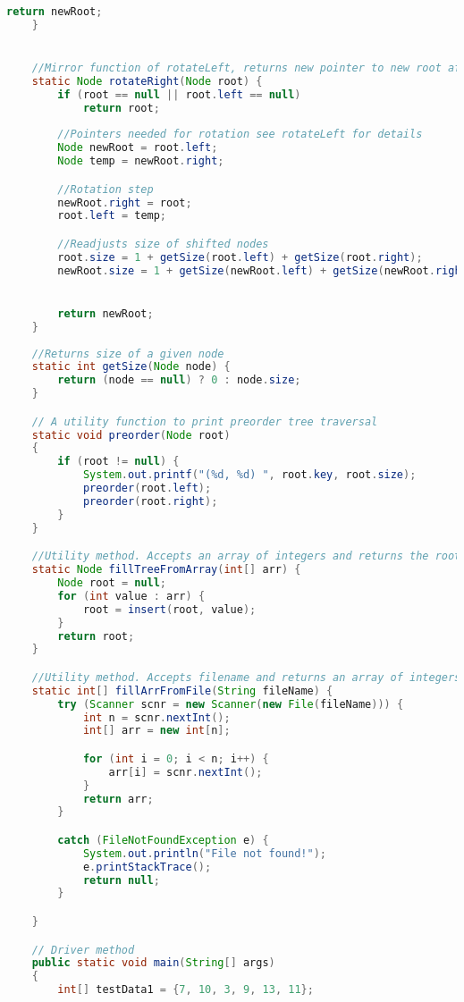 \documentclass[11pt]{article}
\begin{document}
\begin{lstlisting}[language=Java]
        return newRoot;
    }


    //Mirror function of rotateLeft, returns new pointer to new root after rotation
    static Node rotateRight(Node root) {
        if (root == null || root.left == null)
            return root;
        
        //Pointers needed for rotation see rotateLeft for details
        Node newRoot = root.left;
        Node temp = newRoot.right;

        //Rotation step
        newRoot.right = root;
        root.left = temp;

        //Readjusts size of shifted nodes
        root.size = 1 + getSize(root.left) + getSize(root.right);
        newRoot.size = 1 + getSize(newRoot.left) + getSize(newRoot.right);


        return newRoot;
    }
    
    //Returns size of a given node
    static int getSize(Node node) {
        return (node == null) ? 0 : node.size;
    }

    // A utility function to print preorder tree traversal
    static void preorder(Node root)
    {
        if (root != null) {
            System.out.printf("(%d, %d) ", root.key, root.size);
            preorder(root.left);
            preorder(root.right);
        }
    }

    //Utility method. Accepts an array of integers and returns the root of a tree with values from array inserted
    static Node fillTreeFromArray(int[] arr) {
        Node root = null;
        for (int value : arr) {
            root = insert(root, value);
        }
        return root;
    }

    //Utility method. Accepts filename and returns an array of integers obtained from file
    static int[] fillArrFromFile(String fileName) {
        try (Scanner scnr = new Scanner(new File(fileName))) {
            int n = scnr.nextInt();
            int[] arr = new int[n];

            for (int i = 0; i < n; i++) {
                arr[i] = scnr.nextInt();
            }
            return arr;
        }

        catch (FileNotFoundException e) {
            System.out.println("File not found!");
            e.printStackTrace();
            return null;
        }

    }

    // Driver method
    public static void main(String[] args)
    {
        int[] testData1 = {7, 10, 3, 9, 13, 11};


\end{lstlisting}
\end{document}

